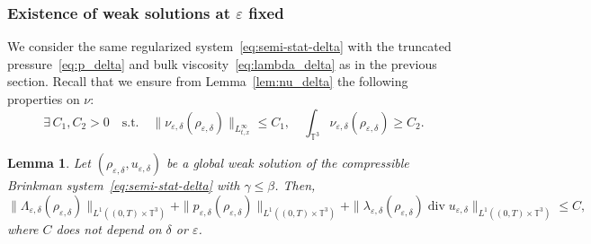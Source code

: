 \documentclass[10pt]{amsart}
\newcommand{\<}{\bigl\langle}
\renewcommand{\>}{\bigr\rangle}
\newtheorem{lem}[thm]{Lemma}
\theoremstyle{definition}
\theoremstyle{remark}
\newcommand{\TT}{\mathbb{T}^3}
\DeclareMathOperator{\Div}{div}
\let\ep\varepsilon
\begin{document}

\subsubsection{Existence of weak solutions at $\ep$ fixed}
We consider the same regularized system~\eqref{eq:semi-stat-delta} with the truncated pressure~\eqref{eq:p_delta} and bulk viscosity~\eqref{eq:lambda_delta} as in the previous section.
Recall that we ensure from Lemma~\ref{lem:nu_delta} the following properties on $\nu$:
\begin{equation*}
\exists\, C_1, C_2 > 0 \quad \text{s.t.} \quad \|\nu_{\ep,\delta}(\rho_{\ep,\delta})\|_{L^\infty_{t,x}}\leq C_1,
\quad \int_{\TT}{\nu_{\ep,\delta}(\rho_{\ep,\delta})} \geq C_2.
\end{equation*}
\begin{lem}\label{lem:controls-1} Let $(\rho_{\varepsilon, \delta}, u_{\varepsilon,\delta})$ be a global weak solution of the compressible Brinkman system~\eqref{eq:semi-stat-delta} with $\gamma \leq \beta$. Then,
\[
\|\Lambda_{\varepsilon,\delta}(\rho_{\ep,\delta})\|_{L^1((0,T)\times \TT)}
+\|p_{\varepsilon,\delta}(\rho_{\ep,\delta})\|_{L^1((0,T)\times \TT)}
+\|\lambda_{\varepsilon,\delta}(\rho_{\ep,\delta}) \Div u_{\varepsilon,\delta}\|_{L^1((0,T)\times \TT)}
\leq C,
\]
where $C$ does not depend on $\delta$ or $\ep$.
\end{lem}
\end{document}
